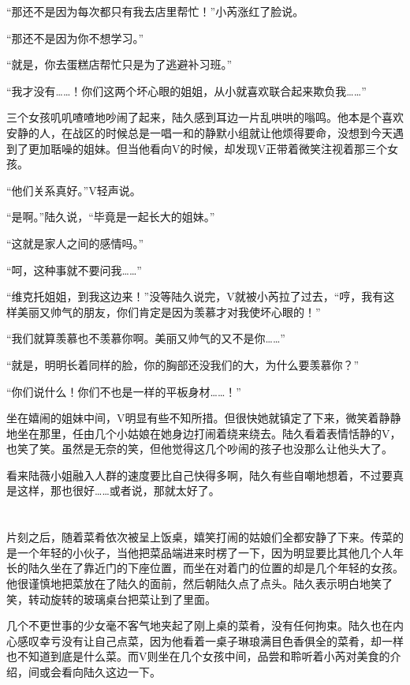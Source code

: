 “那还不是因为每次都只有我去店里帮忙！”小芮涨红了脸说。

“那还不是因为你不想学习。”

“就是，你去蛋糕店帮忙只是为了逃避补习班。”

“我才没有……！你们这两个坏心眼的姐姐，从小就喜欢联合起来欺负我……”

三个女孩叽叽喳喳地吵闹了起来，陆久感到耳边一片乱哄哄的嗡鸣。他本是个喜欢安静的人，在战区的时候总是一唱一和的静默小组就让他烦得要命，没想到今天遇到了更加聒噪的姐妹。但当他看向V的时候，却发现V正带着微笑注视着那三个女孩。

“他们关系真好。”V轻声说。

“是啊。”陆久说，“毕竟是一起长大的姐妹。”

“这就是家人之间的感情吗。”

“呵，这种事就不要问我……”

“维克托姐姐，到我这边来！”没等陆久说完，V就被小芮拉了过去，“哼，我有这样美丽又帅气的朋友，你们肯定是因为羡慕才对我使坏心眼的！”

“我们就算羡慕也不羡慕你啊。美丽又帅气的又不是你……”

“就是，明明长着同样的脸，你的胸部还没我们的大，为什么要羡慕你？”

“你们说什么！你们不也是一样的平板身材……！”

坐在嬉闹的姐妹中间，V明显有些不知所措。但很快她就镇定了下来，微笑着静静地坐在那里，任由几个小姑娘在她身边打闹着绕来绕去。陆久看着表情恬静的V，也笑了笑。虽然是无奈的笑，但他觉得这几个吵闹的孩子也没那么让他头大了。

看来陆薇小姐融入人群的速度要比自己快得多啊，陆久有些自嘲地想着，不过要真是这样，那也很好……或者说，那就太好了。

\section*{}

片刻之后，随着菜肴依次被呈上饭桌，嬉笑打闹的姑娘们全都安静了下来。传菜的是一个年轻的小伙子，当他把菜品端进来时楞了一下，因为明显要比其他几个人年长的陆久坐在了靠近门的下座位置，而坐在对着门的位置的却是几个年轻的女孩。他很谨慎地把菜放在了陆久的面前，然后朝陆久点了点头。陆久表示明白地笑了笑，转动旋转的玻璃桌台把菜让到了里面。

几个不更世事的少女毫不客气地夹起了刚上桌的菜肴，没有任何拘束。陆久也在内心感叹幸亏没有让自己点菜，因为他看着一桌子琳琅满目色香俱全的菜肴，却一样也不知道到底是什么菜。而V则坐在几个女孩中间，品尝和聆听着小芮对美食的介绍，间或会看向陆久这边一下。

